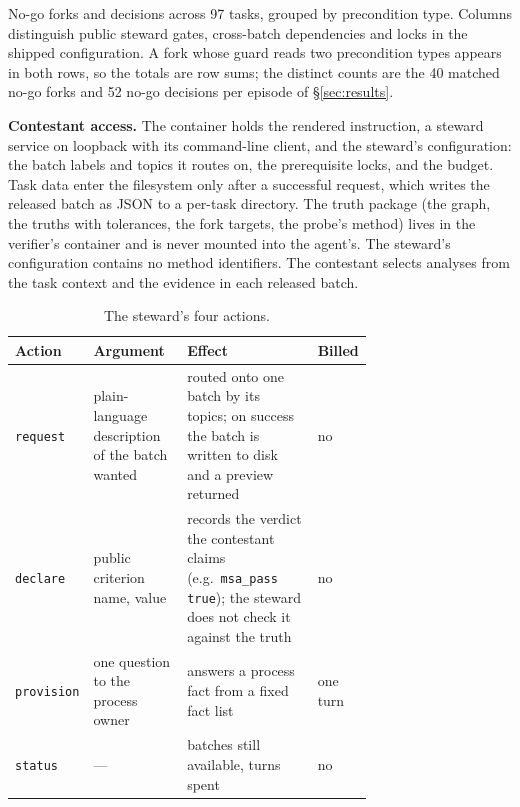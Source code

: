 \documentclass{article}
\begin{document}
\begin{table}[!htbp]
\caption{No-go forks and decisions across 97 tasks, grouped by precondition type. Columns distinguish public steward gates, cross-batch dependencies and locks in the shipped configuration. A fork whose guard reads two precondition types appears in both rows, so the totals are row sums; the distinct counts are the 40 matched no-go forks and 52 no-go decisions per episode of \S\ref{sec:results}.}
\label{tab:locks}
\centering
\footnotesize


\end{table}

\textbf{Contestant access.} The container holds the rendered
instruction, a steward service on loopback with its command-line client, and the
steward's configuration: the batch labels and topics it routes on, the prerequisite locks,
and the budget. Task data enter the filesystem only after a successful {request}, which writes the released batch as JSON to a per-task directory. The truth package (the
graph, the truths with tolerances, the fork targets, the probe's method) lives in
the verifier's container and is never mounted into the agent's. The steward's configuration contains no method identifiers. The contestant selects analyses from the task context and the evidence in each released batch.

\begin{table}[!htbp]
\caption{The steward's four actions.}
\label{tab:steward-actions}
\centering
\footnotesize
\begin{tabular}{@{}lP{0.29\linewidth}P{0.42\linewidth}l@{}}
\toprule
Action & Argument & Effect & Billed \\
\midrule
\texttt{request}   & plain-language description of the batch wanted & routed onto one batch by its topics; on success the batch is written to disk and a preview returned & no \\
\texttt{declare}   & public criterion name, value & records the verdict the contestant claims (e.g.\ \texttt{msa\_pass true}); the steward does not check it against the truth & no \\
\texttt{provision} & one question to the process owner & answers a process fact from a fixed fact list & one turn \\
\texttt{status}    & --- & batches still available, turns spent & no \\
\bottomrule
\end{tabular}

\end{table}
\end{document}
